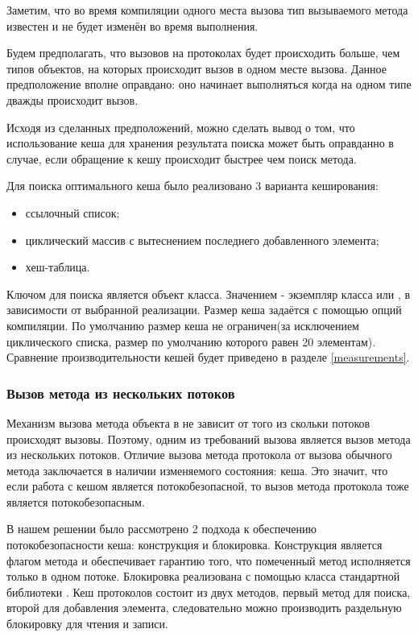 Заметим, что во время компиляции одного места вызова тип вызываемого метода известен и не будет изменён во время выполнения.

Будем предполагать, что вызовов на протоколах будет происходить больше, чем типов объектов, на которых происходит вызов в одном месте вызова. Данное предположение вполне оправдано: оно начинает выполняться когда на одном типе дважды происходит вызов.

Исходя из сделанных предположений, можно сделать вывод о том, что использование кеша для хранения результата поиска может быть оправданно в случае, если обращение к кешу происходит быстрее чем поиск метода.

Для поиска оптимального кеша было реализовано 3 варианта кеширования:
\begin{itemize}
  \item ссылочный список;
  \item циклический массив с вытеснением последнего добавленного элемента;
  \item хеш-таблица.
\end{itemize}

Ключом для поиска является объект класса. Значением - экземпляр класса  или , в зависимости от выбранной реализации. Размер кеша задаётся с помощью опций компиляции. По умолчанию размер кеша не ограничен(за исключением циклического списка, размер по умолчанию которого равен 20 элементам). Сравнение производительности кешей будет приведено в разделе \ref{measurements}.

\subsubsection{Вызов метода из нескольких потоков}
Механизм вызова метода объекта в  не зависит от того из скольки потоков происходят вызовы. Поэтому, одним из требований вызова является вызов метода из нескольких потоков. Отличие вызова метода протокола от вызова обычного метода заключается в наличии изменяемого состояния: кеша. Это значит, что если работа с кешом является потокобезопасной, то вызов метода протокола тоже является потокобезопасным.

В нашем решении было рассмотрено 2 подхода к обеспечению потокобезопасности кеша: \cite{jvm:sync} конструкция и  блокировка. Конструкция  является флагом метода и обеспечивает гарантию того, что помеченный метод исполняется только в одном потоке. Блокировка  реализована с помощью класса стандартной библиотеки \cite{jvm:rwlock}. Кеш протоколов состоит из двух методов, первый метод для поиска, второй для добавления элемента, следовательно можно производить раздельную блокировку для чтения и записи.

